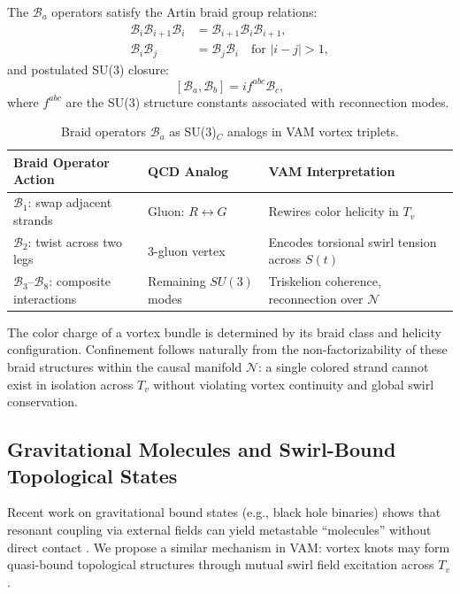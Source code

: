 \documentclass[12pt]{article}
\begin{document}
The \( \mathcal{B}_a \) operators satisfy the Artin braid group relations:
\[
\begin{aligned}
\mathcal{B}_i \mathcal{B}_{i+1} \mathcal{B}_i &= \mathcal{B}_{i+1} \mathcal{B}_i \mathcal{B}_{i+1}, \\
\mathcal{B}_i \mathcal{B}_j &= \mathcal{B}_j \mathcal{B}_i \quad \text{for } |i - j| > 1,
\end{aligned}
\]
and postulated SU(3) closure:
\[
[\mathcal{B}_a, \mathcal{B}_b] = i f^{abc} \mathcal{B}_c,
\]
where \( f^{abc} \) are the SU(3) structure constants associated with reconnection modes.

\begin{table}[H]
\centering
\scriptsize
\renewcommand{\arraystretch}{1.4}
\begin{tabular}{|l|l|l|}
\hline
\textbf{Braid Operator Action} & \textbf{QCD Analog} & \textbf{VAM Interpretation} \\
\hline
$ \mathcal{B}_1 $: swap adjacent strands & Gluon: \( R \leftrightarrow G \) & Rewires color helicity in $ T_v $ \\
$ \mathcal{B}_2 $: twist across two legs & 3-gluon vertex & Encodes torsional swirl tension across $ S(t) $ \\
$ \mathcal{B}_3$–$\mathcal{B}_8 $: composite interactions & Remaining $SU(3)$ modes & Triskelion coherence, reconnection over $ \mathcal{N} $ \\
\hline
\end{tabular}
\caption{Braid operators \( \mathcal{B}_a \) as SU(3)\(_C\) analogs in VAM vortex triplets.}
\end{table}

The color charge of a vortex bundle is determined by its braid class and helicity configuration. Confinement follows naturally from the non-factorizability of these braid structures within the causal manifold \( \mathcal{N} \): a single colored strand cannot exist in isolation across $ T_v $ without violating vortex continuity and global swirl conservation.

\subsection{Gravitational Molecules and Swirl-Bound Topological States}

Recent work on gravitational bound states (e.g., black hole binaries) shows that resonant coupling via external fields can yield metastable “molecules” without direct contact \cite{baumann2023black}. We propose a similar mechanism in VAM: vortex knots may form quasi-bound topological structures through mutual swirl field excitation across \( T_v \).
\end{document}
